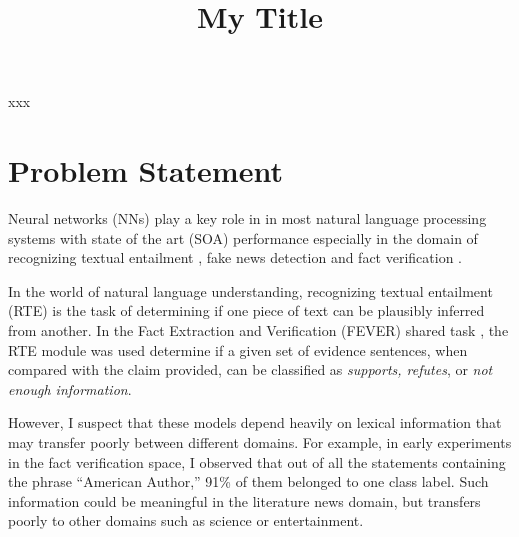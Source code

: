 \documentclass[conference,onecolumn]{IEEEtran}
\begin{document}
\title{My Title}  


\author{\IEEEauthorblockN{}
}



\maketitle


\begin{IEEEkeywords}
xxx
\end{IEEEkeywords}


%



\section*{Problem Statement}
Neural networks (NNs)  play a key role in in most natural language processing systems with state of the art (SOA) performance \cite{devlin2018bert, sun2018improving,bohnet2018morphosyntactic} especially in the domain of recognizing textual entailment \cite{kim2018semantic}, fake news detection \cite{baird2017talos} and fact verification \cite{nie2018combining}.

In the world of natural language understanding, recognizing textual entailment (RTE) is the task of determining if one piece of text can be plausibly inferred from another. In the Fact Extraction and Verification (FEVER) shared task \cite{thorne2018fever}, the RTE module was used determine if a given set of evidence sentences, when compared with the claim provided, can be classified as \textit{supports, refutes}, or \textit{not enough information}.


However, I suspect that these models depend heavily on lexical information that may transfer poorly between different domains. For example, in early experiments in the fact verification space, I observed that out of all the statements containing the phrase ``American Author,'' 91\% of them belonged to one class label. Such information could be meaningful in the literature news domain, but transfers poorly to other domains such as science or entertainment. 
\end{document}

